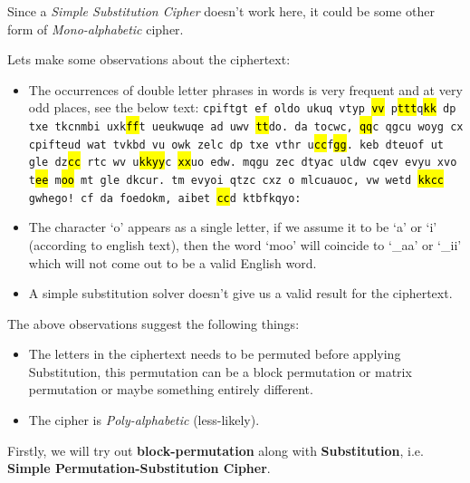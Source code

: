 \documentclass[10pt,twoside]{article}
\newcommand{\myth}[1]{\textcolor{red}{\hl{#1}}}
\begin{document}
Since a \textit{Simple Substitution Cipher} doesn't work here, it could be some other form of \textit{Mono-alphabetic} cipher. \newline

Lets make some observations about the ciphertext:
\begin{itemize}
  \setlength\itemsep{0em}
    \item The occurrences of double letter phrases in words is very frequent and at very odd places, see the below text: \newline
      \texttt{cpiftgt ef oldo ukuq vtyp \myth{vv} p\myth{ttt}q\myth{kk} dp txe tkcnmbi uxk\myth{ff}t ueukwuqe ad uwv \myth{tt}do. da tocwc, \myth{qq}c qgcu woyg cx cpifteud wat tvkbd vu owk zelc dp txe vthr u\myth{cc}f\myth{gg}. keb dteuof ut gle dz\myth{cc} rtc wv u\myth{kkyy}c \myth{xx}uo edw. mqgu zec dtyac uldw cqev evyu xvo t\myth{ee} m\myth{oo} mt gle dkcur. tm evyoi qtzc cxz o mlcuauoc, vw wetd \myth{kkcc} gwhego! cf da foedokm, aibet \myth{cc}d ktbfkqyo:}
    \item The character `o' appears as a single letter, if we assume it to be `a' or `i' (according to english text), then the word `moo' will coincide to `\_aa' or `\_ii' which will not come out to be a valid English word.
    \item A simple substitution solver doesn't give us a valid result for the ciphertext.
\end{itemize}

The above observations suggest the following things:
\begin{itemize}
  \setlength\itemsep{0em}
    \item The letters in the ciphertext needs to be permuted before applying Substitution, this permutation can be a block permutation or matrix permutation or maybe something entirely different.
    \item The cipher is \textit{Poly-alphabetic} (less-likely).
\end{itemize}

Firstly, we will try out \textbf{block-permutation} along with \textbf{Substitution}, i.e. \textbf{Simple Permutation-Substitution Cipher}. \newline
\end{document}
